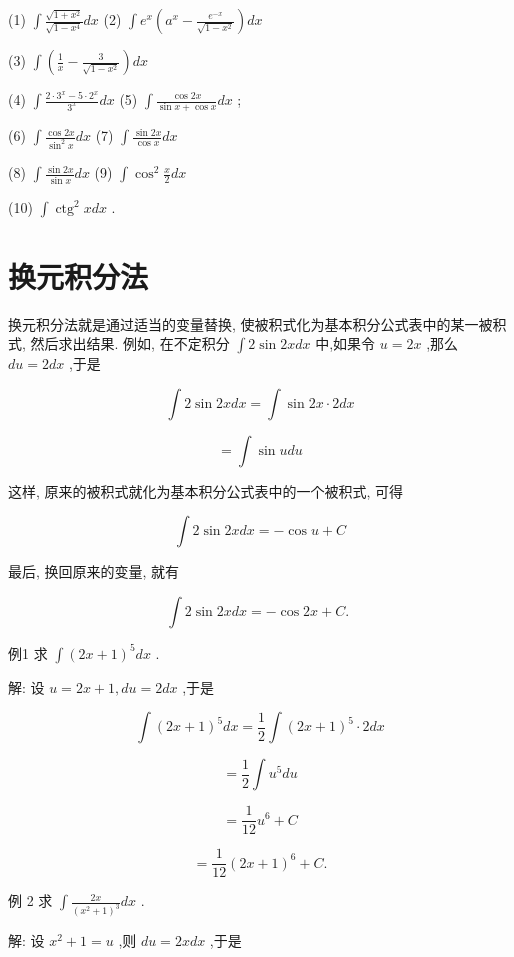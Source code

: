 \documentclass[lang=cn,newtx,10pt,scheme=chinese]{elegantbook}
\begin{document}
\begin{problemset}[习 题 十 三]
(1) \(\int \frac{\sqrt{1 + {x}^{2}}}{\sqrt{1 - {x}^{4}}}{dx}\) (2) \(\int {e}^{x}\left( {{a}^{x} - \frac{{e}^{-x}}{\sqrt{1 - {x}^{2}}}}\right) {dx}\)

(3) \(\int \left( {\frac{1}{x} - \frac{3}{\sqrt{1 - {x}^{2}}}}\right) {dx}\)

(4) \(\int \frac{2 \cdot {3}^{x} - 5 \cdot {2}^{x}}{{3}^{x}}{dx}\) (5) \(\int \frac{\cos {2x}}{\sin x + \cos x}{dx}\) ;

(6) \(\int \frac{\cos {2x}}{{\sin }^{2}x}{dx}\) (7) \(\int \frac{\sin {2x}}{\cos x}{dx}\)

(8) \(\int \frac{\sin {2x}}{\sin x}{dx}\) (9) \(\int {\cos }^{2}\frac{x}{2}{dx}\)

(10) \(\int {\operatorname{ctg}}^{2}{xdx}\) .

\end{problemset}

\section{换元积分法}

换元积分法就是通过适当的变量替换, 使被积式化为基本积分公式表中的某一被积式, 然后求出结果. 例如, 在不定积分 \(\int 2\sin {2xdx}\) 中,如果令 \(u = {2x}\) ,那么 \({du} = {2dx}\) ,于是

\[
\int 2\sin {2xdx} = \int \sin {2x} \cdot {2dx}
\]

\[
= \int \sin {udu}
\]

这样, 原来的被积式就化为基本积分公式表中的一个被积式, 可得

\[
\int 2\sin {2xdx} = - \cos u + C
\]

最后, 换回原来的变量, 就有

\[
\int 2\sin {2xdx} = - \cos {2x} + C\text{. }
\]

例1 求 \(\int {\left( 2x + 1\right) }^{5}{dx}\) .

解: 设 \(u = {2x} + 1,{du} = {2dx}\) ,于是

\[
\int {\left( 2x + 1\right) }^{5}{dx} = \frac{1}{2}\int {\left( 2x + 1\right) }^{5} \cdot {2dx}
\]

\[
= \frac{1}{2}\int {u}^{5}{du}
\]

\[
= \frac{1}{12}{u}^{6} + C
\]

\[
= \frac{1}{12}{\left( 2x + 1\right) }^{6} + C\text{.}
\]

例 2 求 \(\int \frac{2x}{{\left( {x}^{2} + 1\right) }^{3}}{dx}\) .

解: 设 \({x}^{2} + 1 = u\) ,则 \({du} = {2xdx}\) ,于是
\end{document}
